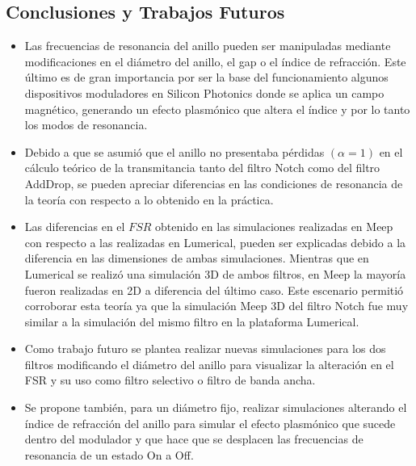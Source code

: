 \subsection{Conclusiones y Trabajos Futuros}
\begin{itemize}
\item Las frecuencias de resonancia del anillo pueden ser manipuladas mediante
modificaciones en el diámetro del anillo, el gap o el índice de refracción. Este
último es de gran importancia por ser la base del funcionamiento algunos dispositivos
moduladores en Silicon Photonics donde se aplica un campo
magnético, generando un efecto plasmónico que altera el índice y por lo tanto
los modos de resonancia.
\item Debido a que se asumió que el anillo no presentaba pérdidas $(\alpha = 1)$ en
el cálculo teórico de la transmitancia tanto del filtro Notch como del filtro
AddDrop, se pueden apreciar diferencias en las condiciones de resonancia
de la teoría con respecto a lo obtenido en la práctica.
\item Las diferencias en el $FSR$ obtenido en las simulaciones realizadas en Meep
con respecto a las realizadas en Lumerical, pueden ser explicadas debido a la 
diferencia en las dimensiones de ambas simulaciones. Mientras que en Lumerical 
se realizó una simulación 3D de ambos filtros, en Meep la mayoría fueron realizadas
en 2D a diferencia del último caso. Este escenario permitió corroborar esta teoría
ya que la simulación Meep 3D del filtro Notch fue muy similar a la simulación del mismo
filtro en la plataforma Lumerical.
\item Como trabajo futuro se plantea realizar nuevas simulaciones para los dos
filtros modificando el diámetro del anillo para visualizar 
la alteración en el FSR y su uso como filtro selectivo o filtro de banda ancha.
\item Se propone también, para un diámetro fijo, realizar simulaciones alterando 
el índice de refracción del anillo para simular el efecto plasmónico que 
sucede dentro del modulador y que hace que se desplacen las frecuencias de resonancia
de un estado On a Off.
\end{itemize} 
